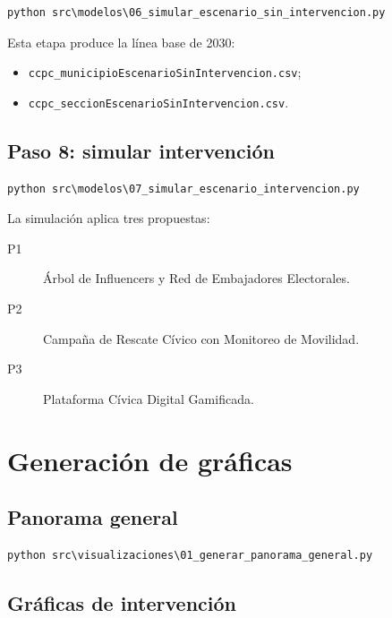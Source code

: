 \documentclass[11pt,a4paper]{article}
\newcommand{\ruta}[1]{\texttt{\small #1}}
\begin{document}
\begin{lstlisting}[style=terminal]
python src\modelos\06_simular_escenario_sin_intervencion.py
\end{lstlisting}

Esta etapa produce la línea base de 2030:

\begin{itemize}
    \item \ruta{ccpc\_municipioEscenarioSinIntervencion.csv};
    \item \ruta{ccpc\_seccionEscenarioSinIntervencion.csv}.
\end{itemize}

\subsection{Paso 8: simular intervención}

\begin{lstlisting}[style=terminal]
python src\modelos\07_simular_escenario_intervencion.py
\end{lstlisting}

La simulación aplica tres propuestas:

\begin{description}
    \item[P1] Árbol de Influencers y Red de Embajadores Electorales.
    \item[P2] Campaña de Rescate Cívico con Monitoreo de Movilidad.
    \item[P3] Plataforma Cívica Digital Gamificada.
\end{description}

\section{Generación de gráficas}

\subsection{Panorama general}

\begin{lstlisting}[style=terminal]
python src\visualizaciones\01_generar_panorama_general.py
\end{lstlisting}

\subsection{Gráficas de intervención}
\end{document}
